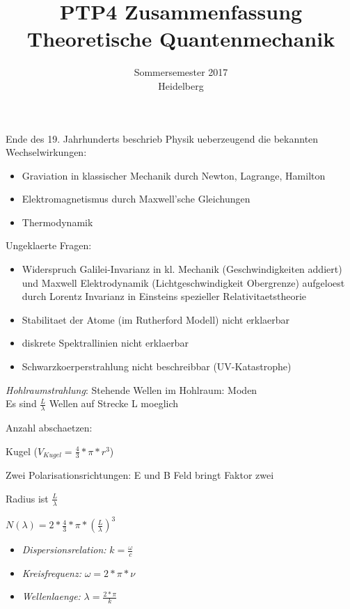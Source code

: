 \documentclass{article}
\begin{document}
\title{PTP4 Zusammenfassung \\ Theoretische Quantenmechanik}
\date{Sommersemester 2017\\Heidelberg}
\maketitle


Ende des 19. Jahrhunderts beschrieb Physik ueberzeugend die bekannten Wechselwirkungen:
\begin{itemize}
\item Graviation in klassischer Mechanik durch Newton, Lagrange, Hamilton
\item Elektromagnetismus durch Maxwell'sche Gleichungen
\item Thermodynamik
\end{itemize}

Ungeklaerte Fragen: 
\begin{itemize}
\item Widerspruch Galilei-Invarianz in kl. Mechanik (Geschwindigkeiten addiert) und Maxwell Elektrodynamik (Lichtgeschwindigkeit Obergrenze) aufgeloest durch Lorentz Invarianz in Einsteins spezieller Relativitaetstheorie
\item Stabilitaet der Atome (im Rutherford Modell) nicht erklaerbar
\item diskrete Spektrallinien nicht erklaerbar
\item Schwarzkoerperstrahlung nicht beschreibbar (UV-Katastrophe)
\end{itemize}

\emph{Hohlraumstrahlung}: 
Stehende Wellen im Hohlraum: Moden \\
Es sind $\frac{L}{\lambda}$ Wellen auf Strecke L moeglich


Anzahl abschaetzen:


Kugel ($V_{Kugel}=\frac{4}{3}*\pi*r^3$)


Zwei Polarisationsrichtungen: E und B Feld bringt Faktor zwei


Radius ist $\frac{L}{\lambda}$

$N(\lambda)  = 2*\frac{4}{3}*\pi*(\frac{L}{\lambda})^3$

\begin{itemize}
\item\emph{Dispersionsrelation:} $k = \frac{\omega}{c}$
\item\emph{Kreisfrequenz:} $\omega = 2*\pi*\nu$
\item\emph{Wellenlaenge:} $\lambda = \frac{2*\pi}{k}$
\end{itemize}
\end{document}
